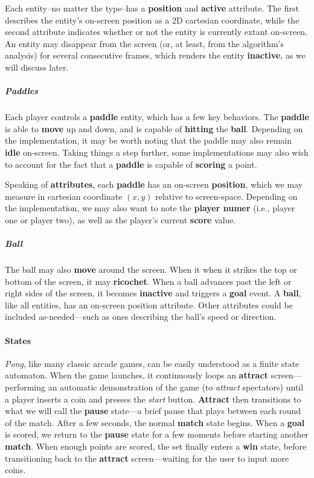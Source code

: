 \documentclass{report}
\newcommand{\state}[1]{\textbf{#1}}
\newcommand{\pad}{\textbf{paddle}\xspace}
\newcommand{\ball}{\textbf{ball}\xspace}
\begin{document}
Each entity--no matter the type--has a \state{position} and \state{active} attribute. The first describes the entity's on-screen position as a 2D cartesian coordinate, while the second attribute indicates whether or not the entity is currently extant on-screen. An entity may disappear from the screen (or, at least, from the algorithm's analysis) for several consecutive frames, which renders the entity \state{inactive}, as we will discuss later.

\subparagraph{Paddles}

Each player controls a \pad entity, which has a few key behaviors. The \pad is able to \state{move} up and down, and is capable of \state{hitting} the \ball. Depending on the implementation, it may be worth noting that the paddle may also remain \state{idle} on-screen. Taking things a step further, some implementations may also wish to account for the fact that a \pad is capable of \state{scoring} a point. 

Speaking of \state{attributes}, each \pad has an on-screen \state{position}, which we may measure in cartesian coordinate $(x,y)$ relative to screen-space. Depending on the implementation, we may also want to note the \state{player numer} (i.e., player one or player two), as well as the player's current \state{score} value. 

\subparagraph{Ball} The ball may also \state{move} around the screen. When it when it strikes the top or bottom of the screen, it may \state{ricochet}. When a ball advances past the left or right sides of the screen, it becomes \state{inactive} and triggers a \state{goal} event.
A \ball, like all entities, has an on-screen position attribute. Other attributes could be included as-needed---such as ones describing the ball's speed or direction.


\paragraph{States} 

\emph{Pong}, like many classic arcade games, can be easily understood as a finite state automaton. When the game launches, it continuously loops an \state{attract} screen---performing an automatic demonstration of the game (to \emph{attract} spectators) until a player inserts a coin and presses the \emph{start} button. \state{Attract} then transitions to what we will call the \state{pause} state---a brief pause that plays between each round of the match. After a few seconds, the normal \state{match} state begins. When a \state{goal} is scored, we return to the \state{pause} state for a few moments before starting another \state{match}. When enough points are scored, the set finally enters a \state{win} state, before transitioning back to the \state{attract} screen---waiting for the user to input more coins. 
\end{document}
